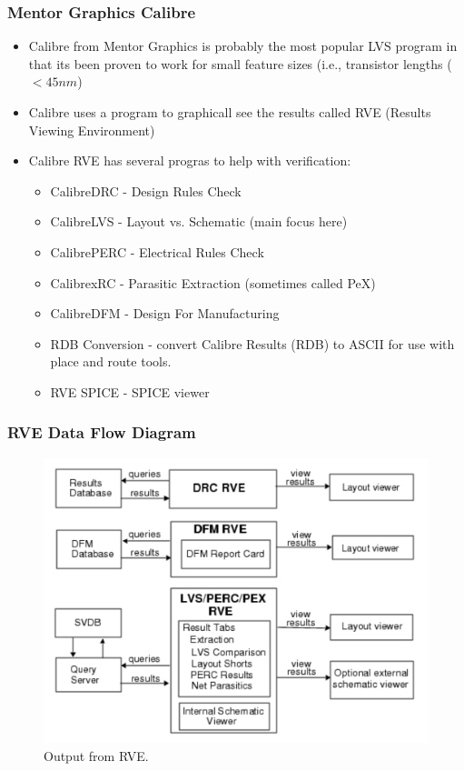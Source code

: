 \documentclass{beamer}
\begin{document}
\begin{frame}
\frametitle{Mentor Graphics Calibre}
\begin{itemize}
\item Calibre from Mentor Graphics is probably the most popular LVS
  program in that its been proven to work for small feature sizes
  (i.e., transistor lengths ($< 45nm$) 
\item Calibre uses a program to graphicall see the results called RVE
  (Results Viewing Environment)
\item Calibre RVE has several progras to help with verification:
\begin{itemize}
\item CalibreDRC - Design Rules Check
\item CalibreLVS - Layout vs. Schematic (main focus here)
\item CalibrePERC - Electrical Rules Check
\item CalibrexRC - Parasitic Extraction (sometimes called PeX)
\item CalibreDFM - Design For Manufacturing 
\item RDB Conversion - convert Calibre Results (RDB) to ASCII for use
  with place and route tools.
\item RVE SPICE - SPICE viewer
\end{itemize}
\end{itemize}
\end{frame}
\begin{frame}
\frametitle{RVE Data Flow Diagram}
\begin{center}
  \begin{figure}
	\vspace{-0.1in}
\includegraphics[scale=0.125]{Fig/lvs2.png} 
\vspace{-0.1in}
\caption{Output from RVE.}
\end{figure}
\end{center}
\end{frame}
\end{document}
